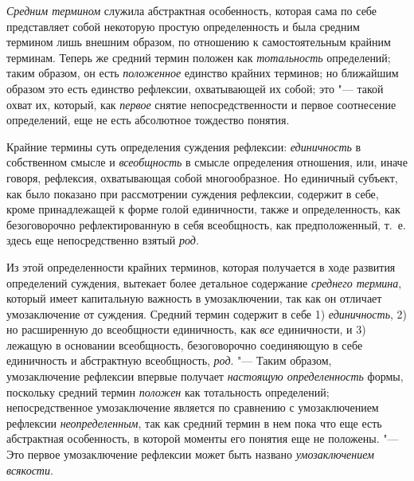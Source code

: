 {{{\em Средним термином}
служила абстрактная особенность, которая сама по себе
представляет собой некоторую простую определенность и была средним термином
лишь внешним образом, по отношению к самостоятельным крайним терминам.
Теперь же средний термин положен как
{\em тотальность}
определений; таким образом, он есть
{\em положенное} единство
крайних терминов; но ближайшим образом это есть единство рефлексии,
охватывающей их собой; это "--- такой охват их, который, как
{\em первое} снятие
непосредственности и первое соотнесение определений, еще не есть абсолютное
тождество понятия.

Крайние термины суть определения суждения рефлексии:
{\em единичность} в
собственном смысле и {\em всеобщность}
в смысле определения отношения, или, иначе говоря, рефлексия,
охватывающая собой многообразное. Но единичный субъект, как было показано
при рассмотрении суждения рефлексии, содержит в себе, кроме принадлежащей к
форме голой единичности, также и определенность, как безоговорочно
рефлектированную в себя всеобщность, как предположенный, т.~е. здесь еще
непосредственно взятый {\em род}.

Из этой определенности крайних терминов, которая получается в
ходе развития определений суждения, вытекает более детальное содержание
{\em среднего термина},
который имеет капитальную важность в умозаключении, так как
он отличает умозаключение от суждения. Средний термин содержит в себе 1)
{\em единичность}, 2) но
расширенную до всеобщности единичность, как
{\em все} единичности, и
3) лежащую в основании всеобщность, безоговорочно соединяющую в себе
единичность и абстрактную всеобщность,
{\em род}. "--- Таким
образом, умозаключение рефлексии впервые получает
{\em настоящую определенность}
формы, поскольку средний термин
{\em положен} как
тотальность определений; непосредственное умозаключение является
по сравнению с умозаключением рефлексии
{\em неопределенным}, так
как средний термин в нем пока что еще есть абстрактная особенность, в
которой моменты его понятия еще не положены. "--- Это первое
умозаключение рефлексии может быть названо
{\em умозаключением
всякости}.

}}
